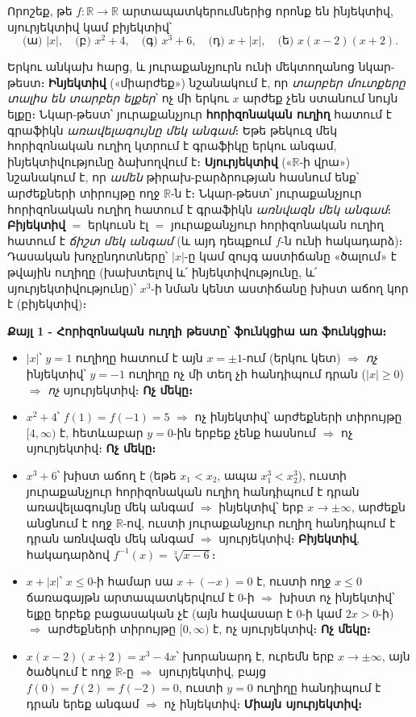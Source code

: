 \documentclass[11pt,a4paper]{article}
\newcommand{\R}{\mathbb{R}}
\begin{document}
\begin{problembox}[6]
Որոշեք, թե $f:\R\to\R$ արտապատկերումներից որոնք են ինյեկտիվ, սյուրյեկտիվ կամ բիյեկտիվ՝
\[
\text{(ա) } |x|,\quad
\text{(բ) } x^2+4,\quad
\text{(գ) } x^3+6,\quad
\text{(դ) } x+|x|,\quad
\text{(ե) } x(x-2)(x+2).
\]
\end{problembox}

\begin{ideabox}
Երկու անկախ հարց, և յուրաքանչյուրն ունի մեկտողանոց նկար-թեստ։
\textbf{Ինյեկտիվ} («միարժեք») նշանակում է, որ \emph{տարբեր մուտքերը տալիս են տարբեր ելքեր}՝
ոչ մի երկու $x$ արժեք չեն ստանում նույն ելքը։ Նկար-թեստ՝ յուրաքանչյուր \textbf{հորիզոնական
ուղիղ} հատում է գրաֆիկն \emph{առավելագույնը մեկ անգամ}։ Եթե թեկուզ մեկ հորիզոնական ուղիղ կտրում է
գրաֆիկը երկու անգամ, ինյեկտիվությունը ձախողվում է։ \textbf{Սյուրյեկտիվ} («$\R$-ի վրա») նշանակում է, որ
\emph{ամեն} թիրախ-բարձրության հասնում ենք՝ արժեքների տիրույթը ողջ $\R$-ն է։ Նկար-թեստ՝ յուրաքանչյուր
հորիզոնական ուղիղ հատում է գրաֆիկն \emph{առնվազն մեկ անգամ}։ \textbf{Բիյեկտիվ} $=$ երկուսն էլ $=$
յուրաքանչյուր հորիզոնական ուղիղ հատում է \emph{ճիշտ մեկ անգամ} (և այդ դեպքում $f$-ն ունի հակադարձ)։
Դասական խոչընդոտները՝ $|x|$-ը կամ զույգ աստիճանը «ծալում» է թվային ուղիղը (խախտելով և՛
ինյեկտիվությունը, և՛ սյուրյեկտիվությունը)՝ $x^3$-ի նման կենտ աստիճանը խիստ աճող կոր է (բիյեկտիվ)։
\end{ideabox}

\textbf{Քայլ 1 - Հորիզոնական ուղղի թեստը՝ ֆունկցիա առ ֆունկցիա։}
\begin{itemize}[leftmargin=1.4em,itemsep=1pt]
\item[(ա)] $|x|$՝ $y=1$ ուղիղը հատում է այն $x=\pm1$-ում (երկու կետ) $\Rightarrow$ \emph{ոչ}
ինյեկտիվ՝ $y=-1$ ուղիղը ոչ մի տեղ չի հանդիպում դրան ($|x|\ge0$) $\Rightarrow$ \emph{ոչ} սյուրյեկտիվ։
\textbf{Ոչ մեկը։}
\item[(բ)] $x^2+4$՝ $f(1)=f(-1)=5$ $\Rightarrow$ ոչ ինյեկտիվ՝ արժեքների տիրույթը $[4,\infty)$ է, հետևաբար $y=0$-ին
երբեք չենք հասնում $\Rightarrow$ ոչ սյուրյեկտիվ։ \textbf{Ոչ մեկը։}
\item[(գ)] $x^3+6$՝ խիստ աճող է (եթե $x_1<x_2$, ապա $x_1^3<x_2^3$), ուստի յուրաքանչյուր հորիզոնական
ուղիղ հանդիպում է դրան առավելագույնը մեկ անգամ $\Rightarrow$ ինյեկտիվ՝ երբ $x\to\pm\infty$, արժեքն
անցնում է ողջ $\R$-ով, ուստի յուրաքանչյուր ուղիղ հանդիպում է դրան առնվազն մեկ անգամ $\Rightarrow$
սյուրյեկտիվ։ \textbf{Բիյեկտիվ}, հակադարձով $f^{-1}(x)=\sqrt[3]{x-6}$։
\item[(դ)] $x+|x|$՝ $x\le0$-ի համար սա $x+(-x)=0$ է, ուստի ողջ $x\le0$ ճառագայթն արտապատկերվում է $0$-ի
$\Rightarrow$ խիստ ոչ ինյեկտիվ՝ ելքը երբեք բացասական չէ (այն հավասար է $0$-ի կամ $2x>0$-ի)
$\Rightarrow$ արժեքների տիրույթը $[0,\infty)$ է, ոչ սյուրյեկտիվ։ \textbf{Ոչ մեկը։}
\item[(ե)] $x(x-2)(x+2)=x^3-4x$՝ խորանարդ է, ուրեմն երբ $x\to\pm\infty$, այն ծածկում է ողջ $\R$-ը
$\Rightarrow$ սյուրյեկտիվ, բայց $f(0)=f(2)=f(-2)=0$, ուստի $y=0$ ուղիղը հանդիպում է դրան երեք անգամ
$\Rightarrow$ ոչ ինյեկտիվ։ \textbf{Միայն սյուրյեկտիվ։}
\end{itemize}
\end{document}
